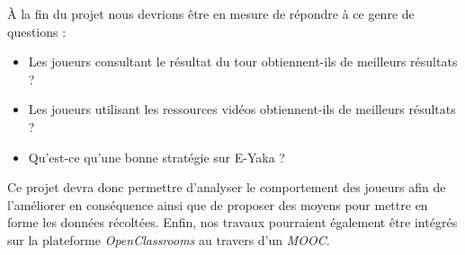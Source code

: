 	À la fin du projet nous devrions être en mesure de répondre à ce genre de questions :
	\begin{itemize}
		\item Les joueurs consultant le résultat du tour obtiennent-ils de meilleurs résultats ?
		\item Les joueurs utilisant les ressources vidéos obtiennent-ils de meilleurs résultats ?
		\item Qu’est-ce qu’une bonne stratégie sur E-Yaka ?
	\end{itemize}

	Ce projet devra donc permettre d’analyser le comportement des joueurs afin de l’améliorer en conséquence ainsi que de proposer des moyens pour mettre en forme les données récoltées. Enfin, nos travaux pourraient également être intégrés sur la plateforme \emph{OpenClassrooms} au travers d’un \emph{MOOC}.
